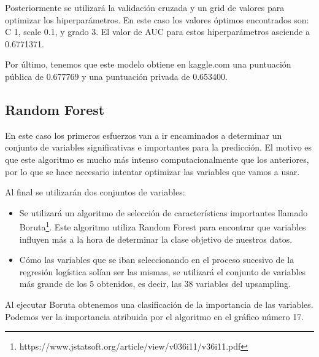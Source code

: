 \documentclass[11pt,a4paper,spanish]{article} %
\begin{document}
Posteriormente se utilizará la validación cruzada y un grid de valores para optimizar los hiperparámetros. En este caso los valores óptimos encontrados son: C 1, scale 0.1, y grado 3. El valor de AUC para estos hiperparámetros asciende a 0.6771371.

Por último, tenemos que este modelo obtiene en kaggle.com una puntuación pública de 0.677769 y una puntuación privada de 0.653400.


\subsection{Random Forest}
En este caso los primeros esfuerzos van a ir encaminados a determinar un conjunto de variables significativas e importantes para la predicción. El motivo es que este algoritmo es mucho más intenso computacionalmente que los anteriores, por lo que se hace necesario intentar optimizar las variables que vamos a usar. 

Al final se utilizarán dos conjuntos de variables:

\begin{itemize}

	\item{Se utilizará un algoritmo de selección de características importantes llamado Boruta\footnote{https://www.jstatsoft.org/article/view/v036i11/v36i11.pdf}. Este algoritmo utiliza Random Forest para encontrar que variables influyen más a la hora de determinar la clase objetivo de nuestros datos.}
	
	\item{Cómo las variables que se iban seleccionando en el proceso sucesivo de la regresión logística solían ser las mismas, se utilizará el conjunto de variables más grande de los 5 obtenidos, es decir, las 38 variables del upsampling.}

\end{itemize}

Al ejecutar Boruta obtenemos una clasificación de la importancia de las variables. Podemos ver la importancia atribuida por el algoritmo en el gráfico número 17. 
\end{document}
